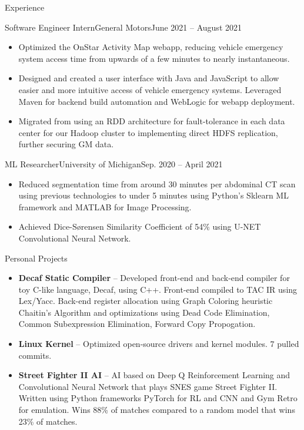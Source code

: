 \documentclass[]{mcdowellcv}
\begin{document}
\begin{cvsection}{Experience}
		\begin{cvsubsection}{Software Engineer Intern}{General Motors}{June 2021 -- August 2021}
			\small{
				\begin{itemize}
					\item Optimized the OnStar Activity Map webapp, reducing vehicle emergency system access time from upwards of a few minutes to nearly instantaneous.
					\item Designed and created a user interface with Java and JavaScript to allow easier and more intuitive access of vehicle emergency systems. Leveraged Maven for backend build automation and WebLogic for webapp deployment.
					\item Migrated from using an RDD architecture for fault-tolerance in each data center for our Hadoop cluster to implementing direct HDFS replication, further securing GM data.
				\end{itemize}
			}
		\end{cvsubsection}
		
		\begin{cvsubsection}{ML Researcher}{University of Michigan}{Sep. 2020 -- April 2021}
			\small{
				\begin{itemize}
					\item Reduced segmentation time from around 30 minutes per abdominal CT scan using previous technologies to under 5 minutes using Python's Sklearn ML framework and MATLAB for Image Processing.
					\item Achieved Dice-Sørensen Similarity Coefficient of 54\% using U-NET Convolutional Neural Network.
				\end{itemize}
			}
		\end{cvsubsection}
	\end{cvsection}
	
	\begin{cvsection}{Personal Projects}
		\begin{cvsubsection}{}{}{}	
			\small{
				\begin{itemize}
					\item \textbf{Decaf Static Compiler} -- Developed front-end and back-end compiler for toy C-like language, Decaf, using C++. Front-end compiled to TAC IR using Lex/Yacc. Back-end register allocation using Graph Coloring heuristic Chaitin's Algorithm and optimizations using Dead Code Elimination, Common Subexpression Elimination, Forward Copy Propogation.
					\item \textbf{Linux Kernel} -- Optimized open-source drivers and kernel modules. 7 pulled commits.
					\item \textbf{Street Fighter II AI} -- AI based on Deep Q Reinforcement Learning and Convolutional Neural Network that plays SNES game Street Fighter II. Written using Python frameworks PyTorch for RL and CNN and Gym Retro for emulation. Wins 88\% of matches compared to a random model that wins 23\% of matches.
				\end{itemize}
			}
		\end{cvsubsection}
	\end{cvsection}
\end{document}
